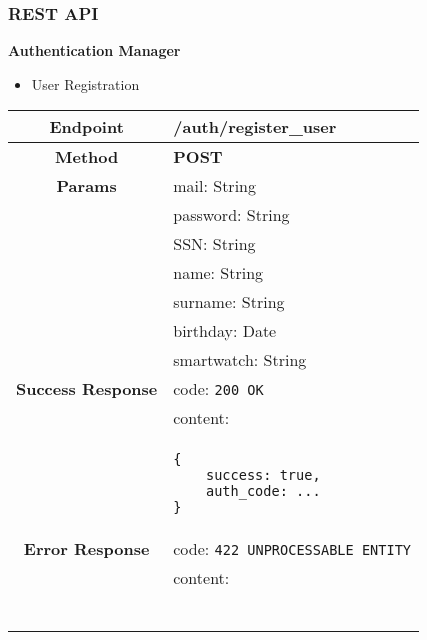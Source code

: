 \subsubsection{REST API}
    \textbf{Authentication Manager}
    \begin{itemize}
        \item User Registration
    \end{itemize}
    \begin{adjustwidth}{1cm}{}
        \begin{tabular}{|c|l|}
            \hline
            \textbf{Endpoint} & /auth/register\_user \\
            \hline
            \textbf{Method} & \textbf{POST} \\
            \hline
            \textbf{Params} & mail: String \\
            &                 password: String \\
            &                 SSN: String \\
            &                 name: String \\
            &                 surname: String \\
            &                 birthday: Date \\
            &                 smartwatch: String \\
            \hline
            \textbf{Success Response} & code: \texttt{200 OK} \\
            &                           content: \\
            & \begin{minipage}[t]{0.5\textwidth}
                \begin{adjustwidth}{1.5cm}{}
                \begin{verbatim}
{
    success: true, 
    auth_code: ...
}
                \end{verbatim}
                \end{adjustwidth}
              \end{minipage} \\
              \hline
            \textbf{Error Response} & code: \texttt{422 UNPROCESSABLE ENTITY} \\
            &                         content: \\
            & \begin{minipage}[t]{0.7\textwidth}
                \begin{adjustwidth}{1.5cm}{}
                \begin{verbatim}

\end{verbatim}
\end{adjustwidth}
\end{minipage}
\end{tabular}
\end{adjustwidth}
